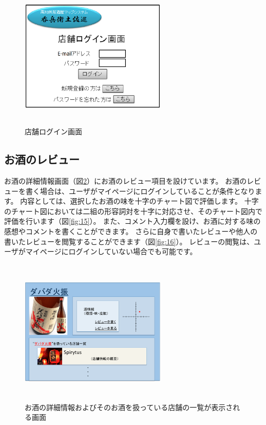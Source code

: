 \documentclass[a4j,titlepage]{jarticle}
\begin{document}
\begin{figure}[htbp]
  \begin{center}
  \includegraphics [height=7cm, width=7cm]{extrnal1_design_document_image/s5.eps}
  \caption{店舗ログイン画面}
  \label {fig:s5}
  \end{center}
\end{figure}

\newpage
\subsection{お酒のレビュー}
お酒の詳細情報画面（図\ref{fig:14}）にお酒のレビュー項目を設けています。
お酒のレビューを書く場合は、ユーザがマイページにログインしていることが条件となります。
内容としては、選択したお酒の味を十字のチャート図で評価します。
十字のチャート図においては二組の形容詞対を十字に対応させ、そのチャート図内で評価を行います（図\ref{fig:15}）。
また、コメント入力欄を設け、お酒に対する味の感想やコメントを書くことができます。
さらに自身で書いたレビューや他人の書いたレビューを閲覧することができます（図\ref{fig:16}）。
レビューの閲覧は、ユーザがマイページにログインしていない場合でも可能です。

\begin {figure}[htbp]
    \begin{center}
    \includegraphics [height=7cm, width=7cm]{extrnal_design_document_image/14.eps}
    \caption {お酒の詳細情報およびそのお酒を扱っている店舗の一覧が表示される画面}
    \label {fig:14}
    \end{center}
\end {figure}
\end{document}
